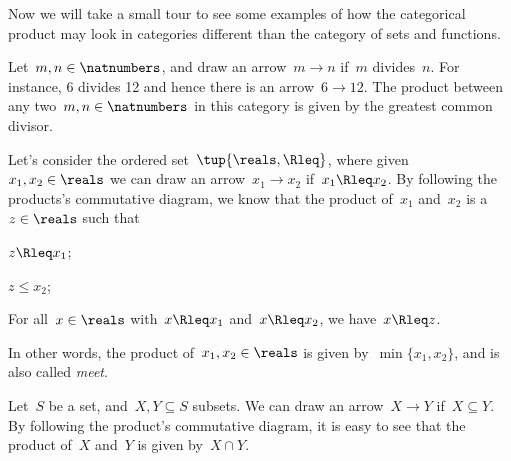 Now we will take a small tour to see some examples of how the categorical product may look in categories different than the category \Set of sets and functions.

\begin{example}
    Let~$m,n\in \natnumbers$, and draw an arrow~$m\to n$ if~$m$ divides~$n$. For instance, 6 divides 12 and hence there is an arrow~$6\to 12$. The product between any two~$m,n\in \natnumbers$ in this category is given by the greatest common divisor.
\end{example}

\begin{example}
    Let's consider the ordered set~$\tup{\reals,\Rleq}$, where given~$x_1,x_2\in \reals$ we can draw an arrow~$x_1\to x_2$ if~$x_1\Rleq x_2$. By following the products's commutative diagram, we know that the product of~$x_1$ and~$x_2$ is a~$z\in \reals$ such that
    \begin{compactitem}
        \item $z\Rleq x_1$;
        \item $z\leq x_2$;
        \item For all~$x\in \reals$ with~$x\Rleq x_1$ and~$x\Rleq x_2$, we have~$x\Rleq z$.
    \end{compactitem}
    In other words, the product of~$x_1,x_2\in \reals$ is given by~$\min\{x_1,x_2\}$, and is also called \emph{meet}.
\end{example}

\begin{example}
    \label{ex:subset_prod}
    Let~$S$ be a set, and~$X,Y\subseteq S$ subsets. We can draw an arrow~$X\to Y$ if~$X\subseteq Y$. By following the product's commutative diagram, it is easy to see that the product of~$X$ and~$Y$ is given by~$X\cap Y$.
\end{example}


